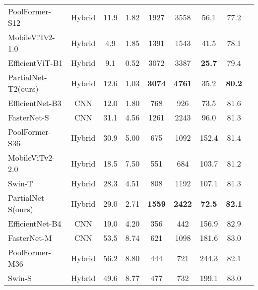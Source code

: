 \begin{table*}[ht]
{\begin{tabular}{@{}lcccccccc@{}}
    PoolFormer-S12\cite{Yu2022a}        &Hybrid   & 11.9      & 1.82  &1927       & 3558        & 56.1        & 77.2       \\
    MobileViTv2-1.0\cite{Mehta2022}     &Hybrid   & 4.9       & 1.85  &1391       & 1543        & 41.5        & 78.1       \\
    EfficientViT-B1\cite{Cai2023b}      &Hybrid   & 9.1       & 0.52  &3072       & 3387        & {\bf 25.7}  & 79.4       \\
    PartialNet-T2(ours)                 &Hybrid   & 12.6      & 1.03  &{\bf 3074} & {\bf 4761}  & 35.2        & {\bf 80.2} \\
    \hline
    EfficientNet-B3\cite{Tan2019}       &CNN      & 12.0      & 1.80  &768        & 926         & 73.5        & 81.6       \\
    FasterNet-S\cite{Chen2023}          &CNN      & 31.1      & 4.56  &1261       & 2243        & 96.0        & 81.3       \\
    PoolFormer-S36\cite{Yu2022a}        &Hybrid   & 30.9      & 5.00  &675        & 1092        & 152.4       & 81.4       \\
    MobileViTv2-2.0\cite{Mehta2022}     &Hybrid   & 18.5      & 7.50  &551        & 684         & 103.7       & 81.2       \\
    Swin-T\cite{Liu2021c}               &Hybrid   & 28.3      & 4.51  &808        & 1192        & 107.1       & 81.3       \\
    PartialNet-S(ours)                  &Hybrid   & 29.0      & 2.71  &{\bf 1559} & {\bf 2422}  & {\bf 72.5}  & {\bf 82.1} \\
    \hline
    EfficientNet-B4\cite{Tan2019}       &CNN      & 19.0      & 4.20  &356        & 442         & 156.9       & 82.9       \\
    FasterNet-M\cite{Chen2023}          &CNN      & 53.5      & 8.74  &621        & 1098        & 181.6       & 83.0       \\
    PoolFormer-M36\cite{Yu2022a}        &Hybrid   & 56.2      & 8.80  &444        & 721         & 244.3       & 82.1       \\
    Swin-S\cite{Liu2021c}               &Hybrid   & 49.6      & 8.77  &477        & 732         & 199.1       & 83.0       \\

\end{tabular}}
\end{table*}
